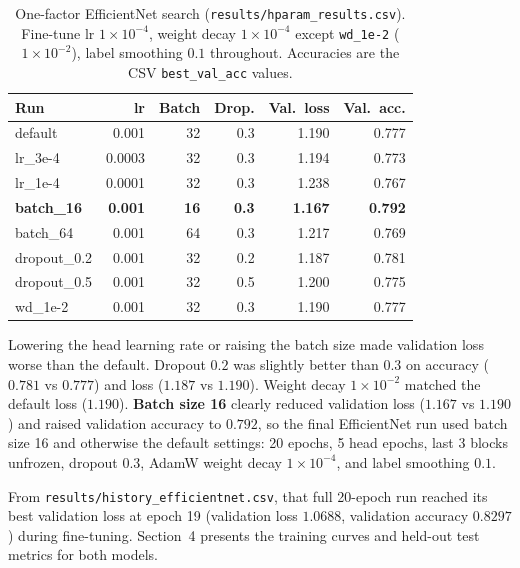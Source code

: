 \begin{table}[H]
  \centering
  \small
  \begin{tabular}{|l|r|r|r|r|r|}
    \hline
    \textbf{Run} & \textbf{lr} & \textbf{Batch} & \textbf{Drop.} & \textbf{Val.\ loss} & \textbf{Val.\ acc.} \\
    \hline
    default      & 0.001  & 32 & 0.3 & 1.190 & 0.777 \\
    lr\_3e-4     & 0.0003 & 32 & 0.3 & 1.194 & 0.773 \\
    lr\_1e-4     & 0.0001 & 32 & 0.3 & 1.238 & 0.767 \\
    \textbf{batch\_16} & \textbf{0.001} & \textbf{16} & \textbf{0.3} & \textbf{1.167} & \textbf{0.792} \\
    batch\_64    & 0.001  & 64 & 0.3 & 1.217 & 0.769 \\
    dropout\_0.2 & 0.001  & 32 & 0.2 & 1.187 & 0.781 \\
    dropout\_0.5 & 0.001  & 32 & 0.5 & 1.200 & 0.775 \\
    wd\_1e-2     & 0.001  & 32 & 0.3 & 1.190 & 0.777 \\
    \hline
  \end{tabular}
  \caption{One-factor EfficientNet search (\texttt{results/hparam\_results.csv}).
  Fine-tune lr $1 \times 10^{-4}$, weight decay $1 \times 10^{-4}$ except
  \texttt{wd\_1e-2} ($1 \times 10^{-2}$), label smoothing $0.1$ throughout.
  Accuracies are the CSV \texttt{best\_val\_acc} values.}
  \label{tab:hparam}
\end{table}

Lowering the head learning rate or raising the batch size made validation
loss worse than the default. Dropout $0.2$ was slightly better than $0.3$ on
accuracy ($0.781$ vs $0.777$) and loss ($1.187$ vs $1.190$). Weight decay
$1 \times 10^{-2}$ matched the default loss ($1.190$). \textbf{Batch size 16}
clearly reduced validation loss ($1.167$ vs $1.190$) and raised validation
accuracy to $0.792$, so the final EfficientNet run used batch size 16 and
otherwise the default settings: 20 epochs, 5 head epochs, last 3 blocks
unfrozen, dropout $0.3$, AdamW weight decay $1 \times 10^{-4}$, and label
smoothing $0.1$.

From \texttt{results/history\_efficientnet.csv}, that full 20-epoch run reached
its best validation loss at epoch 19 (validation loss $1.0688$, validation
accuracy $0.8297$) during fine-tuning. Section~4 presents the training curves
and held-out test metrics for both models.
